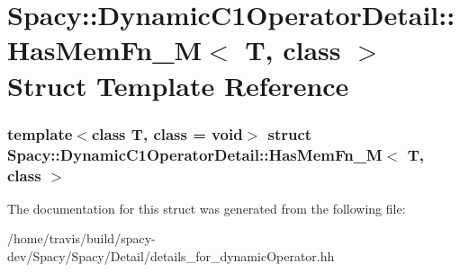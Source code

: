 \hypertarget{structSpacy_1_1DynamicC1OperatorDetail_1_1HasMemFn__M}{\section{\-Spacy\-:\-:\-Dynamic\-C1\-Operator\-Detail\-:\-:\-Has\-Mem\-Fn\-\_\-\-M$<$ \-T, class $>$ \-Struct \-Template \-Reference}
\label{structSpacy_1_1DynamicC1OperatorDetail_1_1HasMemFn__M}
}
\subsubsection*{template$<$class T, class = void$>$ struct Spacy\-::\-Dynamic\-C1\-Operator\-Detail\-::\-Has\-Mem\-Fn\-\_\-\-M$<$ T, class $>$}



\-The documentation for this struct was generated from the following file\-:\begin{DoxyCompactItemize}
\item 
/home/travis/build/spacy-\/dev/\-Spacy/\-Spacy/\-Detail/details\-\_\-for\-\_\-dynamic\-Operator.\-hh\end{DoxyCompactItemize}
